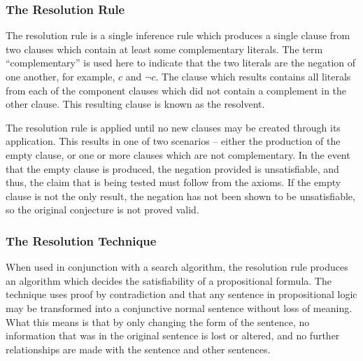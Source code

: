\subsubsection{The Resolution Rule}

The resolution rule is a single inference rule which produces a single clause from two clauses which contain at least some complementary literals. The term ``complementary'' is used here to indicate that the two literals are the negation of one another, for example, $c$ and $\neg c$. The clause which results contains all literals from each of the component clauses which did not contain a complement in the other clause. This resulting clause is known as the resolvent. 

The resolution rule is applied until no new clauses may be created through its application. This results in one of two scenarios -- either the production of the empty clause, or one or more clauses which are not complementary. In the event that the empty clause is produced, the negation provided is unsatisfiable, and thus, the claim that is being tested must follow from the axioms. If the empty clause is not the only result, the negation has not been shown to be unsatisfiable, so the original conjecture is not proved valid.

\subsubsection{The Resolution Technique}

When used in conjunction with a search algorithm, the resolution rule produces an algorithm which decides the satisfiability of a propositional formula. The technique uses proof by contradiction and that any sentence in propositional logic may be transformed into a conjunctive normal sentence without loss of meaning. What this means is that by only changing the form of the sentence, no information that was in the original sentence is lost or altered, and no further relationships are made with the sentence and other sentences.

